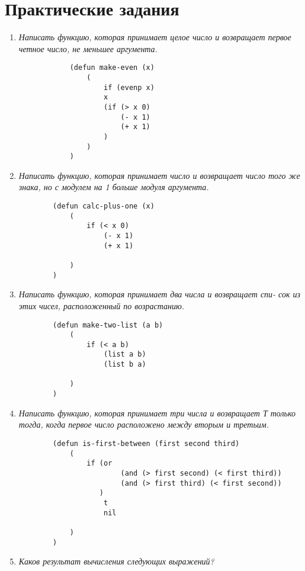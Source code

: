 
\chapter{Практические задания}

\begin{enumerate}[wide=0pt]

	\item \textit{Написать функцию, которая принимает целое число и возвращает первое
	четное число, не меньшее аргумента.}

		\begin{lstlisting}
			(defun make-even (x)
				(
					if (evenp x)
					x
					(if (> x 0)
						(- x 1)
						(+ x 1)
					)
				)
			)
		\end{lstlisting}


	\item  \textit{Написать функцию, которая принимает число и возвращает число
	того же знака, но с модулем на 1 больше модуля аргумента.}

	\begin{lstlisting}
		(defun calc-plus-one (x)
			(
				if (< x 0)
					(- x 1)
					(+ x 1)
				
			)
		)
	\end{lstlisting}

	\item  \textit{Написать функцию, которая принимает два числа и возвращает спи-
	сок из этих чисел, расположенный по возрастанию.}

	\begin{lstlisting}
		(defun make-two-list (a b)
			(
				if (< a b)
					(list a b)
					(list b a)
				
			)
		)
	\end{lstlisting}

	\item  \textit{Написать функцию, которая принимает три числа и возвращает Т
	только тогда, когда первое число расположено между вторым и третьим.}

	\begin{lstlisting}
		(defun is-first-between (first second third)
			(
				if (or 
						(and (> first second) (< first third))
						(and (> first third) (< first second))
				   )
					t
					nil
				
			)
		)
	\end{lstlisting}

	\item  \textit{Каков результат вычисления следующих выражений?}
	

\end{enumerate}

